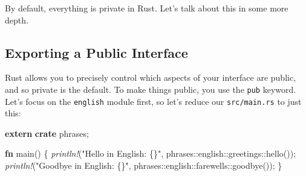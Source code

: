 \documentclass[a4paper,]{book}
\newenvironment{Shaded}{\begin{snugshade}}{\end{snugshade}}
\newcommand{\KeywordTok}[1]{\textcolor[rgb]{0.13,0.29,0.53}{\textbf{{#1}}}}
\newcommand{\StringTok}[1]{\textcolor[rgb]{0.31,0.60,0.02}{{#1}}}
\newcommand{\PreprocessorTok}[1]{\textcolor[rgb]{0.56,0.35,0.01}{\textit{{#1}}}}
\newcommand{\NormalTok}[1]{{#1}}
\begin{document}
\begin{Shaded}
\end{Shaded}

By default, everything is private in Rust. Let's talk about this in some
more depth.

\subsection{Exporting a Public
Interface}\label{exporting-a-public-interface}

Rust allows you to precisely control which aspects of your interface are
public, and so private is the default. To make things public, you use
the \texttt{pub} keyword. Let's focus on the \texttt{english} module
first, so let's reduce our \texttt{src/main.rs} to just this:

\begin{Shaded}
\begin{Highlighting}[]
\KeywordTok{extern} \KeywordTok{crate} \NormalTok{phrases;}

\KeywordTok{fn} \NormalTok{main() \{}
    \PreprocessorTok{println!}\NormalTok{(}\StringTok{"Hello in English: \{\}"}\NormalTok{, phrases::english::greetings::hello());}
    \PreprocessorTok{println!}\NormalTok{(}\StringTok{"Goodbye in English: \{\}"}\NormalTok{, phrases::english::farewells::goodbye());}
\NormalTok{\}}
\end{Highlighting}
\end{Shaded}
\end{document}
